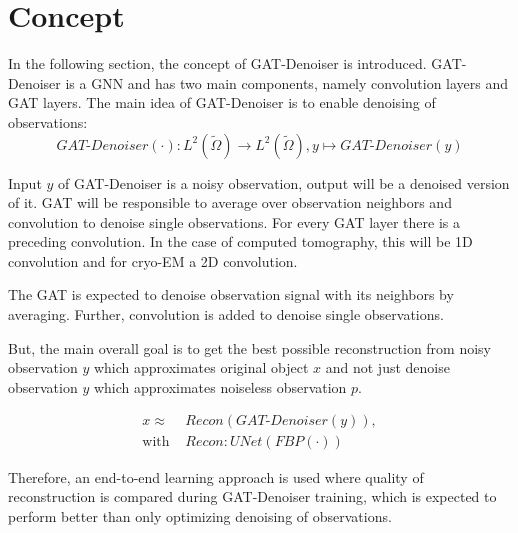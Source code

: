 \section{Concept}
\label{sec:concept}


In the following section, the concept of GAT-Denoiser is introduced. 
GAT-Denoiser is a GNN and has two main components, namely convolution layers and GAT layers.
The main idea of GAT-Denoiser is to enable denoising of observations:
\begin{equation}
  \textit{GAT-Denoiser} (\cdot) : L^2(\tilde{\Omega}) \to  L^2(\tilde{\Omega}) , y \mapsto \textit{GAT-Denoiser} (y) 
\end{equation}


Input $y$ of GAT-Denoiser is a noisy observation, output will be a denoised version of it.
GAT will be responsible to average over observation neighbors and convolution to denoise single observations. 
For every GAT layer there is a preceding convolution. 
In the case of computed tomography, this will be 1D convolution and for cryo-EM a 2D convolution.

\begin{tcolorbox}[colback=red!5!white,colframe=red!75!black]
  The GAT is expected to denoise observation signal with its neighbors by averaging. 
  Further, convolution is added to denoise single observations.
\end{tcolorbox}


But, the main overall goal is to get the best possible reconstruction 
from noisy observation $y$ which approximates original object $x$ and 
not just denoise observation $y$ which approximates noiseless observation $p$.


\begin{equation}
  \begin{aligned}
    x \approx   &\textit{Recon} \left( \textit{GAT-Denoiser} \left( y \right) \right), \\
    \text{with } &\textit{Recon} : \textit{UNet} \left( \textit{FBP} \left( \cdot \right) \right)  
  \end{aligned}
\end{equation}

Therefore, an end-to-end learning approach is used where quality of reconstruction is 
compared during GAT-Denoiser training, which is expected to perform better than 
only optimizing denoising of observations.

